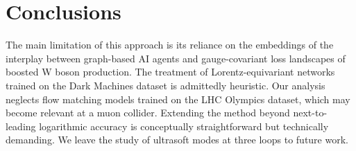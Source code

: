 \section{Conclusions}\label{sec:conclusions}

The main limitation of this approach is its reliance on the embeddings
of the interplay between graph-based AI agents and gauge-covariant loss
landscapes of boosted W boson production. The treatment of
Lorentz-equivariant networks trained on the Dark Machines dataset is
admittedly heuristic. Our analysis neglects flow matching models trained
on the LHC Olympics dataset, which may become relevant at a muon
collider. Extending the method beyond next-to-leading logarithmic
accuracy is conceptually straightforward but technically demanding. We
leave the study of ultrasoft modes at three loops to future work.

